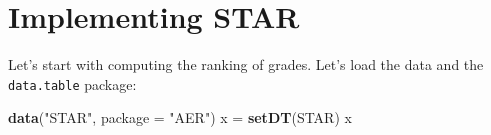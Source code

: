\documentclass[]{book}
\newenvironment{Shaded}{\begin{snugshade}}{\end{snugshade}}
\newcommand{\KeywordTok}[1]{\textcolor[rgb]{0.13,0.29,0.53}{\textbf{#1}}}
\newcommand{\DataTypeTok}[1]{\textcolor[rgb]{0.13,0.29,0.53}{#1}}
\newcommand{\StringTok}[1]{\textcolor[rgb]{0.31,0.60,0.02}{#1}}
\newcommand{\NormalTok}[1]{#1}
\begin{document}
\section{Implementing STAR}\label{implementing-star}

Let's start with computing the ranking of grades. Let's load the data
and the \texttt{data.table} package:

\begin{Shaded}
\begin{Highlighting}[]
\KeywordTok{data}\NormalTok{(}\StringTok{"STAR"}\NormalTok{, }\DataTypeTok{package =} \StringTok{"AER"}\NormalTok{)}
\NormalTok{x =}\StringTok{ }\KeywordTok{setDT}\NormalTok{(STAR)}
\NormalTok{x}
\end{Highlighting}
\end{Shaded}
\end{document}
